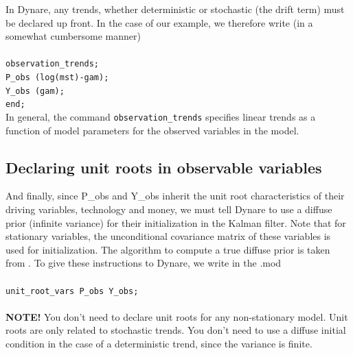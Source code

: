 In Dynare, any trends, whether deterministic or stochastic (the drift term) must be declared up front. In the case of our example, we therefore write (in a somewhat cumbersome manner)\\
\\
\texttt{observation\_trends;\\
P\_obs (log(mst)-gam);\\
Y\_obs (gam);\\
end;}\\

In general, the command \texttt{observation\_trends} specifies linear trends as a function of model parameters for the observed variables in the model.\\

\subsection{Declaring unit roots in observable variables}

And finally, since P\_obs and Y\_obs inherit the unit root characteristics of their driving variables, technology and money, we must tell Dynare to use a diffuse prior (infinite variance) for their initialization in the Kalman filter. Note that for stationary variables, the unconditional covariance matrix of these variables is used for initialization. The algorithm to compute a true diffuse prior is taken from \citet{DurbinKoopman2001}. To give these instructions to Dynare, we write in the .mod\\
\\
\texttt{unit\_root\_vars P\_obs Y\_obs;}\\
\\
\textsf{\textbf{NOTE!}} You don't need to declare unit roots for any non-stationary model. Unit roots are only related to stochastic trends. You don't need to use a diffuse initial condition in the case of a deterministic trend, since the variance is finite.\\

